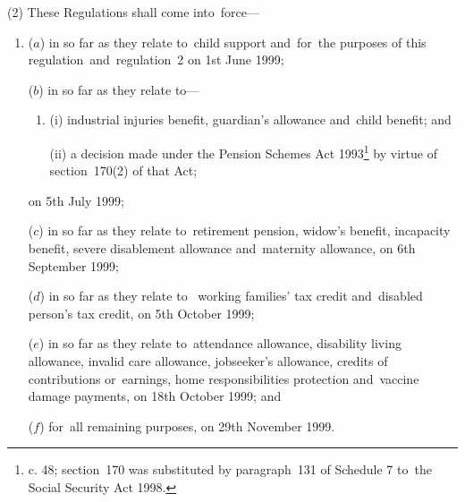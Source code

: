 \documentclass[12pt,a4paper]{article}
\begin{document}
(2) These Regulations shall come into~force—
\begin{enumerate}\item[]
($a$) in so far as they relate to~child support and~for~the purposes of this regulation~and~regulation~2 on 1st June 1999;

($b$) in so far as they relate to—
\begin{enumerate}\item[]
(i) industrial injuries benefit, guardian’s allowance and~child benefit; and

(ii) a decision made under the Pension Schemes Act 1993\footnote{ c. 48; section~170 was substituted by paragraph~131 of Schedule 7 to~the Social Security Act 1998.} by virtue of section~170(2) of that Act;
\end{enumerate}
on 5th July 1999;

($c$) in so far as they relate to~retirement pension, widow’s benefit, incapacity benefit, severe disablement allowance and~maternity allowance, on 6th September 1999;

($d$) in so far as they relate to~
working families' tax credit and~disabled person’s tax credit,  %
on 5th October 1999;

($e$) in so far as they relate to~attendance allowance, disability living allowance, invalid care allowance, jobseeker’s allowance, credits of contributions or~earnings, home responsibilities protection and~vaccine damage payments, on 18th October 1999; and

\pagebreak[3]

($f$) for~all remaining purposes, on 29th November 1999.
\end{enumerate}
\end{document}
